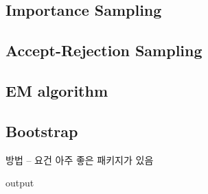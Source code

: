 \documentclass[../tutorial.tex]{subfiles}
\begin{document}
\subsection{Importance Sampling}

\subsection{Accept-Rejection Sampling}

\subsection{EM algorithm}

\subsection{Bootstrap} 
방법 -- 요건 아주 좋은 패키지가 있음 
\begin{Schunk}
\begin{Soutput}
output
\end{Soutput}
\end{Schunk}
\end{document}

